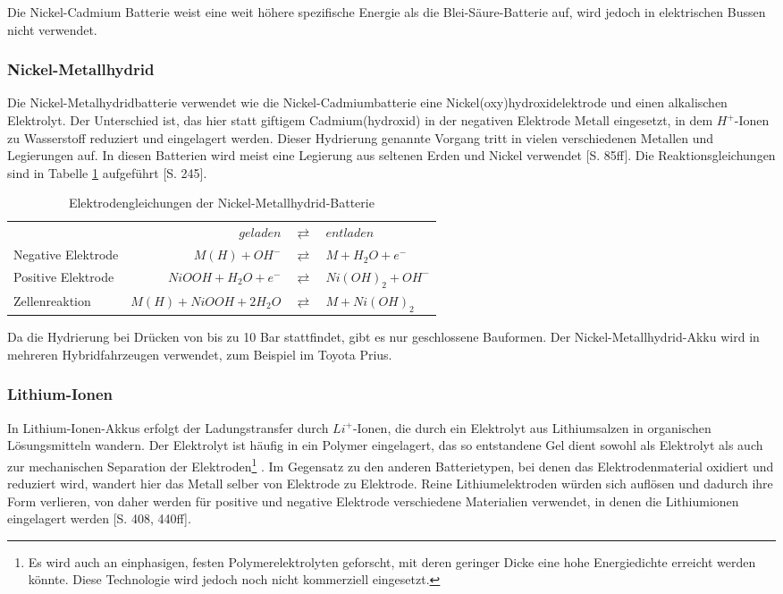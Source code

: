 Die Nickel-Cadmium Batterie weist eine weit höhere spezifische Energie als die Blei-Säure-Batterie auf, wird jedoch in elektrischen Bussen nicht verwendet.

\subsubsection{Nickel-Metallhydrid}
Die Nickel-Metalhydridbatterie verwendet wie die Nickel-Cadmiumbatterie eine Nickel(oxy)hydroxidelektrode und einen alkalischen Elektrolyt. Der Unterschied ist, das hier statt giftigem Cadmium(hydroxid) in der negativen Elektrode Metall eingesetzt, in dem $H^+$-Ionen zu Wasserstoff reduziert und eingelagert werden. Dieser Hydrierung genannte Vorgang tritt in vielen verschiedenen Metallen und Legierungen auf. In diesen Batterien wird meist eine Legierung aus seltenen Erden und Nickel verwendet \cite{KiehneBattery}[S. 85ff]. Die Reaktionsgleichungen sind in Tabelle \ref{NiMH} aufgeführt \cite{Sterner:2014}[S. 245].

\begin{table}\centering
  \begin{tabularx}{\linewidth}{XrcX}
  	                   &              $geladen$ & $\rightleftarrows$ & $entladen$        \\
  	Negative Elektrode &          $M(H) + OH^-$ & $\rightleftarrows$ & $M + H_2O + e^-$  \\
  	Positive Elektrode &   $NiOOH + H_2O + e^-$ & $\rightleftarrows$ & $Ni(OH)_2 + OH^-$ \\ \midrule
  	Zellenreaktion     & $M(H) + NiOOH + 2H_2O$ & $\rightleftarrows$ & $M + Ni(OH)_2$    \\
  \end{tabularx}
  \caption{Elektrodengleichungen der Nickel-Metallhydrid-Batterie}
  \label{NiMH}
\end{table}

Da die Hydrierung bei Drücken von bis zu 10 Bar stattfindet, gibt es nur geschlossene Bauformen. Der Nickel-Metallhydrid-Akku wird in mehreren Hybridfahrzeugen verwendet, zum Beispiel im Toyota Prius.

\subsubsection{Lithium-Ionen}
In Lithium-Ionen-Akkus erfolgt der Ladungstransfer durch $Li^+$-Ionen, die durch ein Elektrolyt aus Lithiumsalzen in organischen Lösungsmitteln wandern. Der Elektrolyt ist häufig in ein Polymer eingelagert, das so entstandene Gel dient sowohl als Elektrolyt als auch zur mechanischen Separation der Elektroden\footnote{Es wird auch an einphasigen, festen Polymerelektrolyten geforscht, mit deren geringer Dicke eine hohe Energiedichte erreicht werden könnte. Diese Technologie wird jedoch noch nicht kommerziell eingesetzt.} \cite{xu2004nonaqueous}. Im Gegensatz zu den anderen Batterietypen, bei denen das Elektrodenmaterial oxidiert und reduziert wird, wandert hier das Metall selber von Elektrode zu Elektrode. Reine Lithiumelektroden würden sich auflösen und dadurch ihre Form verlieren, von daher werden für positive und negative Elektrode verschiedene Materialien verwendet, in denen die Lithiumionen eingelagert werden \cite{KiehneBattery}[S. 408, 440ff].

